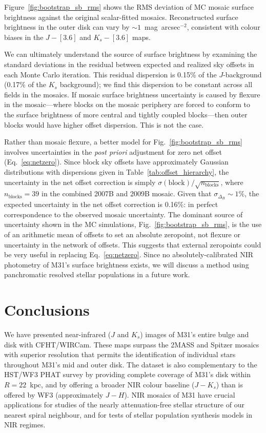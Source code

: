 \documentclass[iop]{emulateapj}
\newcommand{\Fig}[1]{Fig.~\ref{fig:#1}}  %
\newcommand{\Eq}[1]{Eq.~\ref{eq:#1}}  %
\newcommand{\Tab}[1]{Table~\ref{tab:#1}}  %
\begin{document}
Figure~\ref{fig:bootstrap_sb_rms} shows the RMS deviation of MC mosaic surface brightness against the original scalar-fitted mosaics.
Reconstructed surface brightness in the outer disk can vary by $\sim 1$~mag~arcsec$^{-2}$, consistent with colour biases in the $J-[3.6]$ and $K_s-[3.6]$ maps.

We can ultimately understand the source of surface brightness by examining the standard deviations in the residual between expected and realized sky offsets in each Monte Carlo iteration.
This residual dispersion is 0.15\% of the $J$-background (0.17\% of the $K_s$ background); we find this dispersion to be constant across all fields in the mosaics.
If mosaic surface brightness uncertainty is caused by flexure in the mosaic---where blocks on the mosaic periphery are forced to conform to the surface brightness of more central and tightly coupled blocks---then outer blocks would have higher offset dispersion.
This is not the case.

Rather than mosaic flexure, a better model for \Fig{bootstrap_sb_rms} involves uncertainties in the \textit{post priori} adjustment for zero net offset (\Eq{netzero}).
Since block sky offsets have approximately Gaussian distributions with dispersions given in \Tab{offset_hierarchy}, the uncertainty in the net offset correction is simply $\sigma(\mathrm{block})/\sqrt{n_\mathrm{blocks}}$, where $n_\mathrm{blocks}=39$ in the combined 2007B and 2009B mosaic.
Given that $\sigma_{\Delta_B}\sim 1\%$, the expected uncertainty in the net offset correction is 0.16\%: in perfect correspondence to the observed mosaic uncertainty.
The dominant source of uncertainty shown in the MC simulations, \Fig{bootstrap_sb_rms}, is the use of an arithmetic mean of offsets to set an absolute zeropoint, not flexure or uncertainty in the network of offsets.
This suggests that external zeropoints could be very useful in replacing \Eq{netzero}.
Since no absolutely-calibrated NIR photometry of M31's surface brightness exists, we will discuss a method using panchromatic resolved stellar populations in a future work.

\section{Conclusions}
\label{sec:conclusions}

We have presented near-infrared ($J$ and $K_s$) images of M31's entire bulge and disk with CFHT/WIRCam.
These maps surpass the 2MASS \citep{Beaton:2007} and Spitzer \citep{Barmby:2006} mosaics with superior resolution that permits the identification of individual stars throughout M31's mid and outer disk.
The dataset is also complementary to the HST/WF3 PHAT survey \citep{Dalcanton:2012} by providing complete coverage of M31's disk within $R=22$~kpc, and by offering a broader NIR colour baseline ($J-K_s$) than is offered by WF3 (approximately $J-H$).
NIR mosaics of M31 have crucial applications for studies of the nearly attenuation-free stellar structure of our nearest spiral neighbour, and for tests of stellar population synthesis models in NIR regimes.
\end{document}
